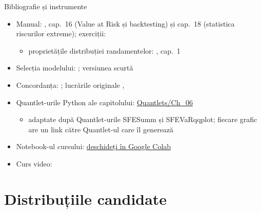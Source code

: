 \begin{frame}{Bibliografie și instrumente}
\itemsize{\small}
\begin{itemize}
    \item Manual: , cap.~16 (Value at Risk și backtesting) și cap.~18 (statistica riscurilor extreme); exerciții: 
    \begin{itemize}
        \item proprietățile distribuției randamentelor: , cap.~1
    \end{itemize}
    \item Selecția modelului: ; versiunea scurtă 
    \item Concordanța: ; lucrările originale , 
    \item Quantlet-urile Python ale capitolului: \href{https://github.com/danpele/SFM/tree/main/Quantlets/Ch_06}{Quantlets/Ch\_06}
    \begin{itemize}
        \item adaptate după Quantlet-urile SFESumm și SFEVaRqqplot; fiecare grafic are un link către Quantlet-ul care îl generează
    \end{itemize}
    \item Notebook-ul cursului: \href{\colaburl{notebooks/EN/chapter6_lecture_notebook.ipynb}}{deschideți în Google Colab}
    \item Curs video: 
\end{itemize}
\end{frame}


\section{Distribuțiile candidate}

